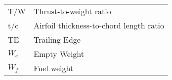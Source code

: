 {\begin{longtable*}{@{}l @{\quad=\quad} l@{}}
    T/W & Thrust-to-weight ratio \\
    t/c & Airfoil thickness-to-chord length ratio \\
    TE & Trailing Edge \\
    $W_e$ & Empty Weight\\
    $W_f$ & Fuel weight \\
\end{longtable*}}

